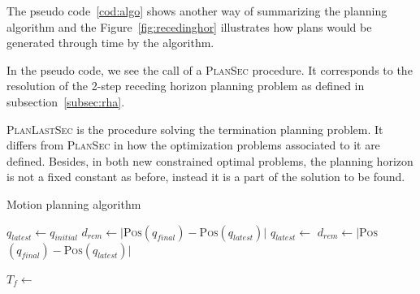 The pseudo code~\ref{cod:algo} shows another way of summarizing the planning algorithm and the Figure~\ref{fig:recedinghor} illustrates how plans would be generated through time by the algorithm.

In the pseudo code, we see the call of a {\scshape PlanSec} procedure.
It corresponds to the resolution of the 2-step receding horizon planning 
problem as defined in subsection~\ref{subsec:rha}.

{\scshape PlanLastSec} is the procedure solving the termination planning
problem. It differs from {\scshape PlanSec} in how the optimization problems associated to it are 
defined. Besides, in both new constrained optimal problems, the planning horizon is not a fixed constant as before, instead it is a part of the solution to be found.

%
%
\begin{algorithm}
    \caption{Motion planning algorithm\label{cod:algo}}
    \label{swpa}
    \begin{algorithmic}[1] %
	    \State $q_{latest} \gets q_{initial}$
	    \State $d_{rem} \gets |${\scshape Pos}$(q_{final}) - ${\scshape Pos}$(q_{latest})|$
	    \State {}
		\State $q_{latest} \gets $
		\State $d_{rem} \gets |${\scshape Pos}$(q_{final}) - ${\scshape Pos}$(q_{latest})|$
		
	    \EndWhile\label{planningwhile}
	    \State {}
	    \State $T_f \gets $
	    
        \EndProcedure
    \end{algorithmic}
\end{algorithm}

